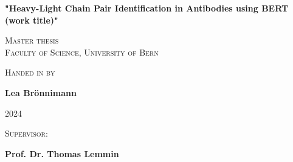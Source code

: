 \begin{titlepage}
  \centering
  {\huge\bfseries "Heavy-Light Chain Pair Identification in Antibodies using BERT (work title)" \par}
  \vspace{2cm}
   {\scshape\LARGE Master thesis \\ Faculty of Science,  University of Bern  \par}
  \vspace{1cm}
  {\scshape\Large Handed in by \par}
  \vspace{0cm}
  {\Large \textbf{Lea Br\"{o}nnimann} \par}
  \vfill
  {\Large \scshape 2024 \par}
  \vspace{2cm}
  {\scshape\Large Supervisor: \par}
  \vspace{0cm}
  {\Large \textbf{Prof. Dr. Thomas Lemmin} \par}
  \textbf{} \par
  \vfill
  \vfill
  \textbf{} \par
   \par
 \par
  \vfill

\end{titlepage}

